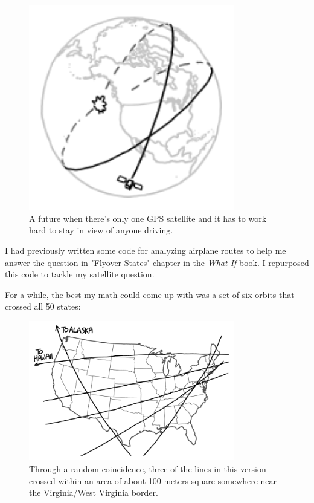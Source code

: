{\begin{figure}[!htbp]
\centering
\includegraphics[scale=0.5, max width=0.8\textwidth]{imgs/a/113/orbits.png}
\caption{A future when there's only one GPS satellite and it has to work hard to stay in view of anyone driving.}
\end{figure}

{I had previously written some code for analyzing airplane routes to help me answer the question in "Flyover States" chapter in the \href{http://www.amazon.com/What-If-Scientific-Hypothetical-Questions/dp/0544272994}{ \emph{What If} book}. I repurposed this code to tackle my satellite question.}

{For a while, the best my math could come up with was a set of six orbits that crossed all 50 states:}

\begin{figure}[!htbp]
\centering
\includegraphics[scale=0.5, max width=0.8\textwidth]{imgs/a/113/six.png}
\caption{Through a random coincidence, three of the lines in this version crossed within an area of about 100 meters square somewhere near the Virginia/West Virginia border.}
\end{figure}

}
